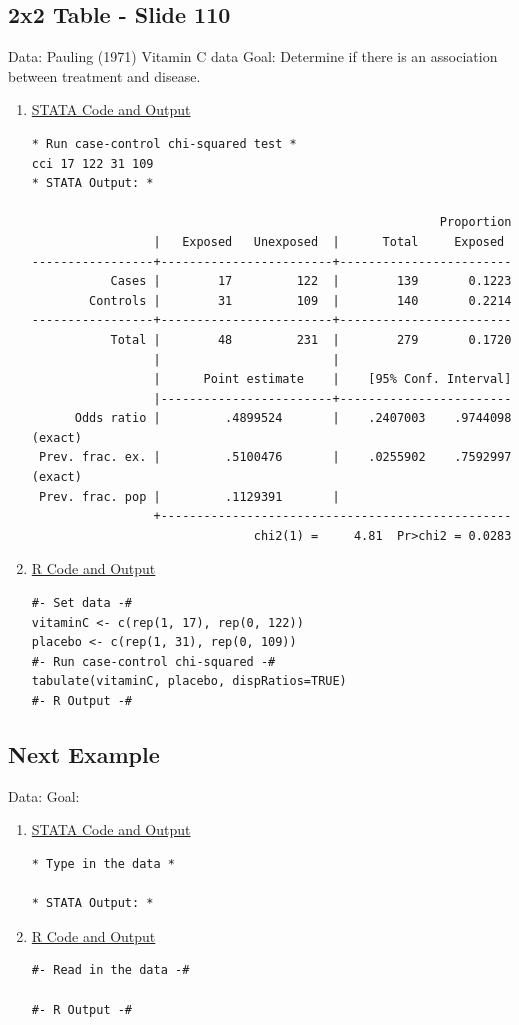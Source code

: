 \documentclass[11pt,letterpaper,fleqn]{report}
\begin{document}
\subsection{2x2 Table - Slide 110}
Data: Pauling (1971) Vitamin C data
\newline Goal: Determine if there is an association between treatment and disease.
\begin{enumerate}[]
\item \underline{STATA Code and Output}
{\scriptsize
\begin{verbatim}
* Run case-control chi-squared test *
cci 17 122 31 109
* STATA Output: *

                                                         Proportion
                 |   Exposed   Unexposed  |      Total     Exposed
-----------------+------------------------+------------------------
           Cases |        17         122  |        139       0.1223
        Controls |        31         109  |        140       0.2214
-----------------+------------------------+------------------------
           Total |        48         231  |        279       0.1720
                 |                        |
                 |      Point estimate    |    [95% Conf. Interval]
                 |------------------------+------------------------
      Odds ratio |         .4899524       |    .2407003    .9744098 (exact)
 Prev. frac. ex. |         .5100476       |    .0255902    .7592997 (exact)
 Prev. frac. pop |         .1129391       |
                 +-------------------------------------------------
                               chi2(1) =     4.81  Pr>chi2 = 0.0283

\end{verbatim}}
\item \underline{R Code and Output}
{\scriptsize
\begin{verbatim}
#- Set data -#
vitaminC <- c(rep(1, 17), rep(0, 122))
placebo <- c(rep(1, 31), rep(0, 109))
#- Run case-control chi-squared -#
tabulate(vitaminC, placebo, dispRatios=TRUE)
#- R Output -#

\end{verbatim}}
\end{enumerate}
\subsection{Next Example}
Data:
\newline Goal:
\begin{enumerate}[]
\item \underline{STATA Code and Output}
{\scriptsize
\begin{verbatim}
* Type in the data *

* STATA Output: *

\end{verbatim}}
\item \underline{R Code and Output}
{\scriptsize
\begin{verbatim}
#- Read in the data -#

#- R Output -#

\end{verbatim}}
\end{enumerate}
\end{document}
